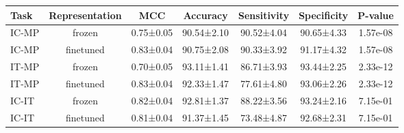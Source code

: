 \begin{tabular}{lcccccc}
\toprule
 Task & Representation &       MCC &   Accuracy & Sensitivity & Specificity &  P-value \\
\midrule
IC-MP &         frozen & 0.75±0.05 & 90.54±2.10 &  90.52±4.04 &  90.65±4.33 & 1.57e-08 \\
IC-MP &      finetuned & 0.83±0.04 & 90.75±2.08 &  90.33±3.92 &  91.17±4.32 & 1.57e-08 \\
IT-MP &         frozen & 0.70±0.05 & 93.11±1.41 &  86.71±3.93 &  93.44±2.25 & 2.33e-12 \\
IT-MP &      finetuned & 0.83±0.04 & 92.33±1.47 &  77.61±4.80 &  93.06±2.26 & 2.33e-12 \\
IC-IT &         frozen & 0.82±0.04 & 92.81±1.37 &  88.22±3.56 &  93.24±2.16 & 7.15e-01 \\
IC-IT &      finetuned & 0.81±0.04 & 91.37±1.45 &  73.48±4.87 &  92.68±2.31 & 7.15e-01 \\
\bottomrule
\end{tabular}
